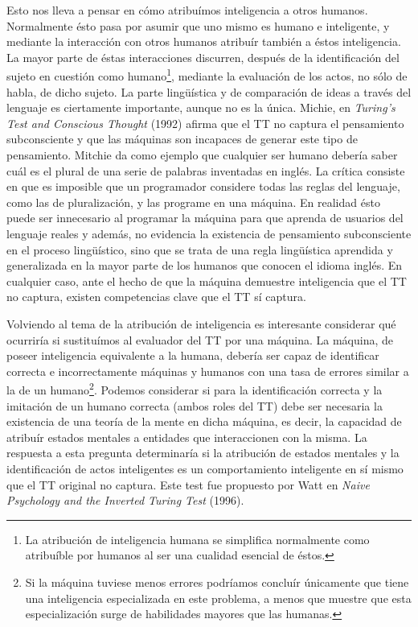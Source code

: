 \documentclass[12pt]{memoir}
\begin{document}
Esto nos lleva a pensar en cómo atribuímos inteligencia a otros humanos. Normalmente ésto pasa por asumir que uno mismo es humano e inteligente, y mediante la interacción con otros humanos atribuír también a éstos inteligencia. La mayor parte de éstas interacciones discurren, después de la identificación del sujeto en cuestión como humano\footnote{La atribución de inteligencia humana se simplifica normalmente como atribuíble por humanos al ser una cualidad esencial de éstos.}, mediante la evaluación de los actos, no sólo de habla, de dicho sujeto. La parte lingüística y de comparación de ideas a través del lenguaje es ciertamente importante, aunque no es la única. Michie, en \textit{Turing’s Test and Conscious Thought} (1992) afirma que el TT no captura el pensamiento subconsciente y que las máquinas son incapaces de generar este tipo de pensamiento. Mitchie da como ejemplo que cualquier ser humano debería saber cuál es el plural de una serie de palabras inventadas en inglés. La crítica consiste en que es imposible que un programador considere todas las reglas del lenguaje, como las de pluralización, y las programe en una máquina. En realidad ésto puede ser innecesario al programar la máquina para que aprenda de usuarios del lenguaje reales y además, no evidencia la existencia de pensamiento subconsciente en el proceso lingüístico, sino que se trata de una regla lingüística aprendida y generalizada en la mayor parte de los humanos que conocen el idioma inglés. En cualquier caso, ante el hecho de que la máquina demuestre inteligencia que el TT no captura, existen competencias clave que el TT sí captura.

Volviendo al tema de la atribución de inteligencia es interesante considerar qué ocurriría si sustituímos al evaluador del TT por una máquina. La máquina, de poseer inteligencia equivalente a la humana, debería ser capaz de identificar correcta e incorrectamente máquinas y humanos con una tasa de errores similar a la de un humano\footnote{Si la máquina tuviese menos errores podríamos concluír únicamente que tiene una inteligencia especializada en este problema, a menos que muestre que esta especialización surge de habilidades mayores que las humanas.}. Podemos considerar si para la identificación correcta y la imitación de un humano correcta (ambos roles del TT) debe ser necesaria la existencia de una teoría de la mente en dicha máquina, es decir, la capacidad de atribuír estados mentales a entidades que interaccionen con la misma. La respuesta a esta pregunta determinaría si la atribución de estados mentales y la identificación de actos inteligentes es un comportamiento inteligente en sí mismo que el TT original no captura. Este test fue propuesto por Watt en \textit{Naive Psychology and the Inverted Turing Test} (1996).
\end{document}
